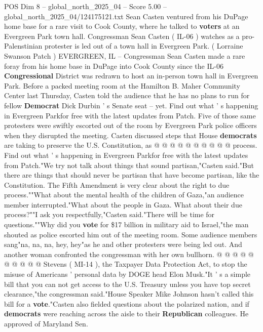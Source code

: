 \begin{textsample}{POS Dim 8 – global\_north\_2025\_04 – Score 5.00 – global\_north\_2025\_04/124175121.txt}  \label{ex:f8_pos_377}
Sean Casten ventured from his DuPage home base for a rare visit to Cook County, where he talked to \textbf{voters} at an Evergreen Park town hall.
Congressman Sean Casten ( IL-06 ) watches as a pro-Palenstinian protester is led out of a town hall in Evergreen Park. ( Lorraine Swanson Patch ) EVERGREEN, IL -- Congressman Sean Casten made a rare foray from his home base in DuPage into Cook County since the IL-06 \textbf{Congressional} District was redrawn to host an in-person town hall in Evergreen Park.
Before a packed meeting room at the Hamilton B.
Maher Community Center last Thursday, Casten told the audience that he has no plans to run for fellow \textbf{Democrat} Dick Durbin ' s Senate seat -- yet.
Find out what ' s happening in Evergreen Parkfor free with the latest updates from Patch.
Five of those same protesters were swiftly escorted out of the room by Evergreen Park police officers when they disrupted the meeting.
Casten discussed steps that House \textbf{democrats} are taking to preserve the U.S.
Constitution, as @ @ @ @ @ @ @ @ @ @ process.
Find out what ' s happening in Evergreen Parkfor free with the latest updates from Patch."We try not talk about things that sound partisan,"Casten said."But there are things that should never be partisan that have become partisan, like the Constitution.
The Fifth Amendment is very clear about the right to due process.""What about the mental health of the children of Gaza,"an audience member interrupted."What about the people in Gaza.
What about their due process?""I ask you respectfully,"Casten said."There will be time for questions.""Why did you \textbf{vote} for \$17 billion in military aid to Israel,"the man shouted as police escorted him out of the meeting room.
Some audience members sang"na, na, na, hey, hey"as he and other protesters were being led out.
And another woman confronted the congressman with her own bullhorn. @ @ @ @ @ @ @ @ @ @ Stevens ( MI-14 ), the Taxpayer Data Protection Act, to stop the misuse of Americans ' personal data by DOGE head Elon Musk."It ' s a simple bill that you can not get access to the U.S.
Treasury unless you have top secret clearance,"the congressman said."House Speaker Mike Johnson hasn't called this bill for a \textbf{vote}."Casten also fielded questions about the polarized nation, and if \textbf{democrats} were reaching across the aisle to their \textbf{Republican} colleagues.
He approved of Maryland Sen.

\end{textsample}
